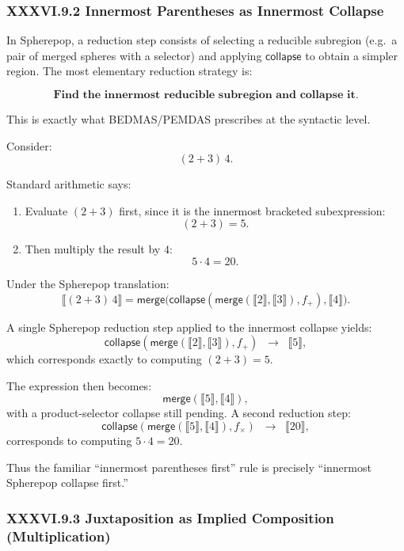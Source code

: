 \documentclass[11pt,letterpaper]{article}
\begin{document}
\subsubsection*{XXXVI.9.2 Innermost Parentheses as Innermost Collapse}

In Spherepop, a reduction step consists of selecting a reducible subregion 
(e.g.\ a pair of merged spheres with a selector) and applying $\mathsf{collapse}$ to
obtain a simpler region. The most elementary reduction strategy is:

\[
\textbf{Find the innermost reducible subregion and collapse it.}
\]

This is exactly what BEDMAS/PEMDAS prescribes at the syntactic level.

Consider:
\[
(2 + 3)\,4.
\]

Standard arithmetic says:

\begin{enumerate}
  \item Evaluate $(2+3)$ first, since it is the innermost bracketed subexpression:
    \[
    (2+3) = 5.
    \]
  \item Then multiply the result by $4$:
    \[
    5 \cdot 4 = 20.
    \]
\end{enumerate}

Under the Spherepop translation:
\[
\llbracket (2 + 3)\,4 \rrbracket
=
\mathsf{merge}\big(
  \mathsf{collapse}(\mathsf{merge}(\llbracket 2 \rrbracket,\llbracket 3 \rrbracket), f_+),
  \llbracket 4 \rrbracket
\big).
\]

A single Spherepop reduction step applied to the innermost collapse yields:
\[
\mathsf{collapse}(\mathsf{merge}(\llbracket 2 \rrbracket,\llbracket 3 \rrbracket), f_+)
\;\;\longrightarrow\;\;
\llbracket 5 \rrbracket,
\]
which corresponds exactly to computing $(2+3) = 5$.

The expression then becomes:
\[
\mathsf{merge}(\llbracket 5 \rrbracket, \llbracket 4 \rrbracket),
\]
with a product-selector collapse still pending. A second reduction step:
\[
\mathsf{collapse}(\mathsf{merge}(\llbracket 5 \rrbracket, \llbracket 4 \rrbracket), f_{\times})
\;\;\longrightarrow\;\;
\llbracket 20 \rrbracket,
\]
corresponds to computing $5 \cdot 4 = 20$.

Thus the familiar “innermost parentheses first” rule is precisely 
“innermost Spherepop collapse first.”

\subsubsection*{XXXVI.9.3 Juxtaposition as Implied Composition (Multiplication)}
\end{document}
